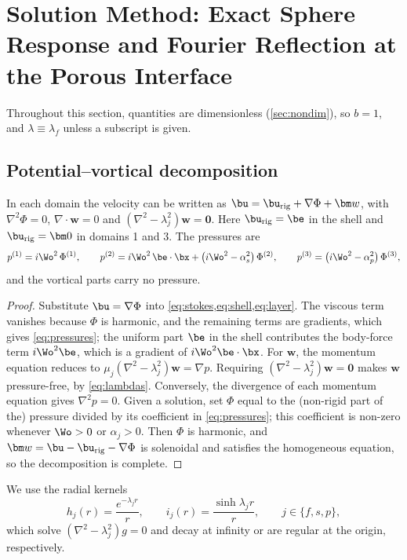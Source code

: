 \section{Solution Method: Exact Sphere Response and Fourier Reflection at the Porous Interface}\label{sec:analysis}

Throughout this section, quantities are dimensionless (\cref{sec:nondim}), so $b=1$, and $\lambda\equiv\lambda_f$
unless a subscript is given.

\subsection{Potential--vortical decomposition}\label{sec:decomp}
\begin{lemma}[Decomposition]\label{lem:decomp}
In each domain the velocity can be written as $\bu=\bu_{\rm rig}+\nabla\Phi+\bm w$, with $\nabla^2\Phi=0$,
$\nabla\cdot\bm w=0$ and $(\nabla^2-\lambda_j^2)\bm w=\bm 0$. Here $\bu_{\rm rig}=\be$ in the shell and
$\bu_{\rm rig}=\bm 0$ in domains 1 and 3. The pressures are
\begin{equation}
  p^{(1)}=i\Wo^2\,\Phi^{(1)},\qquad
  p^{(2)}=i\Wo^2\,\be\cdot\bx+\left(i\Wo^2-\alpha_s^2\right)\Phi^{(2)},\qquad
  p^{(3)}=\left(i\Wo^2-\alpha_p^2\right)\Phi^{(3)},
  \label{eq:pressures}
\end{equation}
and the vortical parts carry no pressure.
\end{lemma}
\begin{proof}
Substitute $\bu=\nabla\Phi$ into \cref{eq:stokes,eq:shell,eq:layer}. The viscous term vanishes because $\Phi$ is
harmonic, and the remaining terms are gradients, which gives \cref{eq:pressures}; the uniform part $\be$ in the shell
contributes the body-force term $i\Wo^2\be$, which is a gradient of $i\Wo^2\be\cdot\bx$. For $\bm w$, the momentum
equation reduces to $\mu_j(\nabla^2-\lambda_j^2)\bm w=\nabla p$. Requiring $(\nabla^2-\lambda_j^2)\bm w=\bm 0$ makes $\bm w$ pressure-free, by \cref{eq:lambdas}. Conversely, the divergence of each momentum equation gives $\nabla^2p=0$. Given a solution, set $\Phi$ equal to the (non-rigid part of the) pressure divided by its coefficient in \cref{eq:pressures}; this coefficient is non-zero whenever $\Wo>0$ or $\alpha_j>0$. Then $\Phi$ is harmonic, and $\bm w=\bu-\bu_{\rm rig}-\nabla\Phi$ is solenoidal and satisfies the homogeneous equation, so the decomposition is complete.
\end{proof}

We use the radial kernels
\begin{equation}
  h_j(r)=\frac{e^{-\lambda_j r}}{r},\qquad i_j(r)=\frac{\sinh\lambda_j r}{r},\qquad j\in\{f,s,p\},
  \label{eq:kernels}
\end{equation}
which solve $(\nabla^2-\lambda_j^2)g=0$ and decay at infinity or are regular at the origin, respectively.

